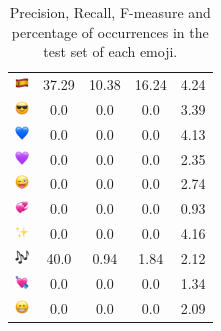 \documentclass{article}
\begin{document}
\begin{table}
\begin{tabular}{|c|ccc|c|}
\includegraphics[height=0.37cm,width=0.37cm]{img/Spain.png} & 37.29 & 10.38 & 16.24 & 4.24\\ 
\includegraphics[height=0.37cm,width=0.37cm]{img/smiling_face_with_sunglasses.png} & 0.0 & 0.0 & 0.0 & 3.39\\ 
\includegraphics[height=0.37cm,width=0.37cm]{img/blue_heart.png} & 0.0 & 0.0 & 0.0 & 4.13\\ 
\includegraphics[height=0.37cm,width=0.37cm]{img/purple_heart.png} & 0.0 & 0.0 & 0.0 & 2.35\\ 
\includegraphics[height=0.37cm,width=0.37cm]{img/winking_face_with_tongue.png} & 0.0 & 0.0 & 0.0 & 2.74\\ 
\includegraphics[height=0.37cm,width=0.37cm]{img/revolving_hearts.png} & 0.0 & 0.0 & 0.0 & 0.93\\ 
\includegraphics[height=0.37cm,width=0.37cm]{img/sparkles.png} & 0.0 & 0.0 & 0.0 & 4.16\\ 
\includegraphics[height=0.37cm,width=0.37cm]{img/musical_notes.png} & 40.0 & 0.94 & 1.84 & 2.12\\ 
\includegraphics[height=0.37cm,width=0.37cm]{img/heart_with_arrow.png} & 0.0 & 0.0 & 0.0 & 1.34\\ 
\includegraphics[height=0.37cm,width=0.37cm]{img/beaming_face_with_smiling_eyes.png} & 0.0 & 0.0 & 0.0 & 2.09\\ 

\hline
\end{tabular}
\caption{\label{table:emoji_detailed} Precision, Recall, F-measure and percentage of occurrences in the test set of each emoji.}
\end{table}
\end{document}
